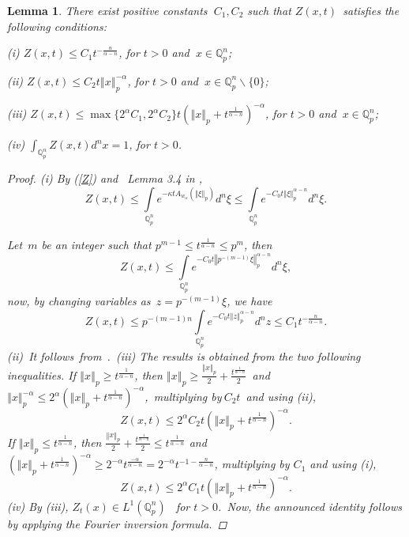 \documentclass{amsart}\usepackage{amsfonts}
\theoremstyle{plain}
\newtheorem{lemma}[theorem]{Lemma}
\numberwithin{equation}{section}
\begin{document}
\begin{lemma}
\label{lemmaZ} There exist positive constants $\ C_{1},C_{2}$ such that
$Z(x,t)$\ satisfies the following conditions:

(i) $Z(x,t)\leq C_{1}t^{-\frac{n}{\alpha-n}}$, for $t>0$ and $\ x\in
\mathbb{Q}_{p}^{n}$;

(ii) $Z(x,t)\leq C_{2}t\left\Vert x\right\Vert _{p}^{-\alpha}$, for $t>0$ and
$\ x\in\mathbb{Q}_{p}^{n}\backslash\{0\}$;

(iii) $Z(x,t)\leq\max\{2^{\alpha}C_{1},2^{\alpha}C_{2}\}t\left(  \left\Vert
x\right\Vert _{p}+t^{\frac{1}{\alpha-n}}\right)  ^{-\alpha}$, for $t>0$ and
$\ x\in\mathbb{Q}_{p}^{n}$;

(iv) ${\textstyle\int\nolimits_{\mathbb{Q}_{p}^{n}}}
Z(x,t)d^{n}x=1$, for $t>0$.

\begin{proof}
(i) By (\ref{Z}) and \ Lemma 3.4 in \cite{Ch-Z},
\[
Z(x,t)\leq\underset{\mathbb{Q}_{p}^{n}}{\int}e^{-\kappa tA_{w_{\alpha}}(\left\Vert \xi\right\Vert _{p})}d^{n}\xi\leq\underset{\mathbb{Q}_{p}^{n}}{\int}e^{-C_{0}t\left\Vert \xi\right\Vert _{p}^{\alpha-n}}d^{n}\xi.
\]


Let\ $m$ be an integer such that $p^{m-1}\leq t^{\frac{1}{\alpha-n}}\leq
p^{m}$, then\[
Z(x,t)\leq\underset{\mathbb{Q}_{p}^{n}}{\int}e^{-C_{0}t\left\Vert
p^{-(m-1)}\xi\right\Vert _{p}^{\alpha-n}}d^{n}\xi,
\]
now, by changing variables as\ $z=p^{-(m-1)}\xi$, we have\[
Z(x,t)\leq p^{-(m-1)n}\underset{\mathbb{Q}_{p}^{n}}{\int}e^{-C_{0}t\left\Vert
z\right\Vert _{p}^{\alpha-n}}d^{n}z\leq C_{1}t^{-\frac{n}{\alpha-n}}.
\]
(ii)\ It follows\ from\ \cite[Lemma 4.1]{Ch-Z}.\ (iii) The results is obtained
from the two following inequalities. If $\left\Vert x\right\Vert _{p}\geq
t^{\frac{1}{\alpha-n}}$, then $\left\Vert x\right\Vert _{p}\geq\frac
{\left\Vert x\right\Vert _{p}}{2}+\frac{t^{\frac{1}{\alpha-n}}}{2}$\ and
\ $\left\Vert x\right\Vert _{p}^{-\alpha}\leq2^{\alpha}\left(  \left\Vert
x\right\Vert _{p}+t^{\frac{1}{\alpha-n}}\right)  ^{-\alpha}$,\ multiplying
by$\ C_{2}t$\ and using (ii),
\[
Z(x,t)\leq2^{\alpha}C_{2}t\left(  \left\Vert x\right\Vert _{p}+t^{\frac
{1}{\alpha-n}}\right)  ^{-\alpha}.
\]
If $\left\Vert x\right\Vert _{p}\leq t^{\frac{1}{\alpha-n}}$, then
$\frac{\left\Vert x\right\Vert _{p}}{2}+\frac{t^{\frac{1}{\alpha-n}}}{2}\leq
t^{\frac{1}{\alpha-n}}$ and \ $\left(  \left\Vert x\right\Vert _{p}+t^{\frac{1}{\alpha-n}}\right)  ^{-\alpha}\geq2^{-\alpha}t^{\frac{-\alpha
}{\alpha-n}}=2^{-\alpha}t^{-1-\frac{n}{\alpha-n}}$, multiplying by $C_{1}$ and
using (i),\
\[
Z(x,t)\leq2^{\alpha}C_{1}t\left(  \left\Vert x\right\Vert _{p}+t^{\frac
{1}{\alpha-n}}\right)  ^{-\alpha}.
\]
(iv) By (iii), $Z_{t}(x)\in L^{1}(\mathbb{Q}_{p}^{n})$ \ for $t>0$.\ Now, the
announced identity follows by applying the Fourier inversion formula.
\end{proof}
\end{lemma}
\end{document}
